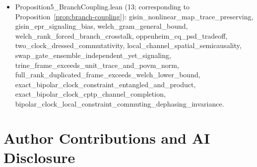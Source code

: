 \documentclass[11pt,a4paper]{article}
\theoremstyle{definition}
\theoremstyle{remark}
\newcommand{\1}{\mathbf{1}}
\newcommand{\code}[1]{{\scriptsize\ttfamily #1}}
\begin{document}
{\begin{itemize}
  \item \code{Proposition5\_\allowbreak BranchCoupling.lean} (13; corresponding to Proposition~\ref{prop:branch-coupling}): \code{gisin\_\allowbreak nonlinear\_\allowbreak map\_\allowbreak trace\_\allowbreak preserving}, \code{gisin\_\allowbreak epr\_\allowbreak signaling\_\allowbreak bias}, \code{welch\_\allowbreak gram\_\allowbreak general\_\allowbreak bound}, \code{welch\_\allowbreak rank\_\allowbreak forced\_\allowbreak branch\_\allowbreak crosstalk}, \code{oppenheim\_\allowbreak cq\_\allowbreak psd\_\allowbreak tradeoff}, \code{two\_\allowbreak clock\_\allowbreak dressed\_\allowbreak commutativity}, \code{local\_\allowbreak channel\_\allowbreak spatial\_\allowbreak semicausality}, \code{swap\_\allowbreak gate\_\allowbreak ensemble\_\allowbreak independent\_\allowbreak yet\_\allowbreak signaling}, \code{trine\_\allowbreak frame\_\allowbreak exceeds\_\allowbreak unit\_\allowbreak trace\_\allowbreak and\_\allowbreak povm\_\allowbreak norm}, \code{full\_\allowbreak rank\_\allowbreak duplicated\_\allowbreak frame\_\allowbreak exceeds\_\allowbreak welch\_\allowbreak lower\_\allowbreak bound}, \code{exact\_\allowbreak bipolar\_\allowbreak clock\_\allowbreak constraint\_\allowbreak entangled\_\allowbreak and\_\allowbreak product}, \code{exact\_\allowbreak bipolar\_\allowbreak clock\_\allowbreak cptp\_\allowbreak channel\_\allowbreak completion}, \code{bipolar\_\allowbreak clock\_\allowbreak local\_\allowbreak constraint\_\allowbreak commuting\_\allowbreak dephasing\_\allowbreak invariance}.
\end{itemize}
}

\section*{Author Contributions and AI Disclosure}\label{sec:ai-disclosure}
\end{document}
